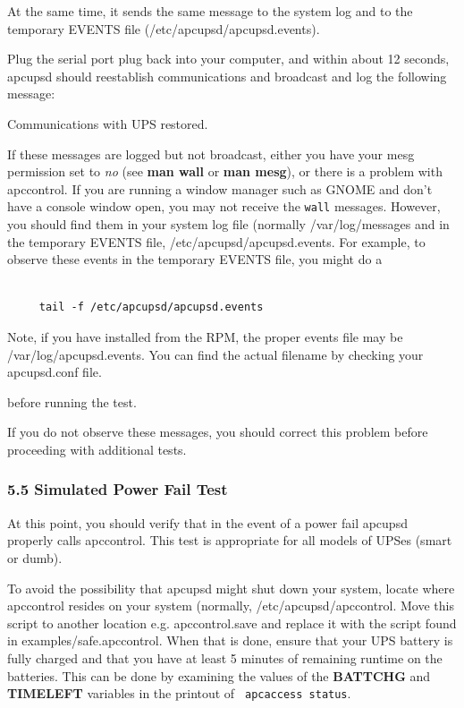 At the same time, it sends the same message to the system log and to the
temporary EVENTS file (/etc/apcupsd/apcupsd.events).  

Plug the serial port plug back into your computer, and within about 12
seconds, apcupsd should reestablish communications and broadcast and log the
following message:  

Communications with UPS restored.  

If these messages are logged but not broadcast, either you have your mesg
permission set to {\it no} (see {\bf man wall} or {\bf man mesg}), or there is
a problem with apccontrol. If you are running a window manager such as GNOME
and don't have a console window open, you may not receive the {\tt wall}
messages. However, you should find them in your system log file (normally
/var/log/messages and in the temporary EVENTS file,
/etc/apcupsd/apcupsd.events. For example, to observe these events in the
temporary EVENTS file, you might do a 

\footnotesize
\begin{verbatim}
     
     tail -f /etc/apcupsd/apcupsd.events
\end{verbatim}
\normalsize

Note, if you have installed from the RPM, the proper events file may be
/var/log/apcupsd.events. You can find the actual filename by checking your
apcupsd.conf file.  

before running the test.  

If you do not observe these messages, you should correct this problem before
proceeding with additional tests. 

\label{Simulated-Power-Fail-Test}

\subsubsection*{5.5 Simulated Power Fail Test}

\label{index-Testing_002c-Simulate-Power-Fail-93}
\label{index-Simulate-Power-Fail-Test-94}
At this point, you should verify that in the event of a power fail apcupsd
properly calls apccontrol. This test is appropriate for all models of UPSes
(smart or dumb).  

To avoid the possibility that apcupsd might shut down your system, locate
where apccontrol resides on your system (normally, /etc/apcupsd/apccontrol.
Move this script to another location e.g. apccontrol.save and replace it with
the script found in examples/safe.apccontrol. When that is done, ensure that
your UPS battery is fully charged and that you have at least 5 minutes of
remaining runtime on the batteries. This can be done by examining the values
of the {\bf BATTCHG} and {\bf TIMELEFT} variables in the printout of {\tt
apcaccess status}.  

